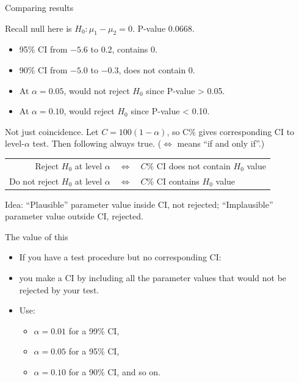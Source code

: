 \documentclass[ignorenonframetext,]{beamer}
\providecommand{\tightlist}{%
  \setlength{\itemsep}{0pt}\setlength{\parskip}{0pt}}
\begin{document}
\begin{frame}{Comparing results}
\protect\hypertarget{comparing-results}{}

Recall null here is \(H_0 : \mu_1 - \mu_2 = 0\). P-value 0.0668.

\begin{itemize}
\tightlist
\item
  95\% CI from \(-5.6\) to 0.2, contains 0.
\item
  90\% CI from \(-5.0\) to \(-0.3\), does not contain 0.
\item
  At \(\alpha = 0.05\), would not reject \(H_0\) since P-value
  \textgreater{} 0.05.
\item
  At \(\alpha = 0.10\), would reject \(H_0\) since P-value \textless{}
  0.10.
\end{itemize}

Not just coincidence. Let \(C = 100(1 - \alpha)\), so C\% gives
corresponding CI to level-\(\alpha\) test. Then following always true.
(\(\iff\) means ``if and only if''.)

\begin{tabular}{|rcl|}
  \hline
  Reject $H_0$ at level $\alpha$ & $\iff$ & $C\%$ CI does not contain $H_0$ value\\
  Do not reject $H_0$ at level $\alpha$ & $\iff$ & $C\%$ CI contains $H_0$ value\\
  \hline
\end{tabular}

Idea: ``Plausible'' parameter value inside CI, not rejected;
``Implausible'' parameter value outside CI, rejected.

\end{frame}

\begin{frame}{The value of this}
\protect\hypertarget{the-value-of-this}{}

\begin{itemize}
\tightlist
\item
  If you have a test procedure but no corresponding CI:
\item
  you make a CI by including all the parameter values that would not be
  rejected by your test.
\item
  Use:

  \begin{itemize}
  \tightlist
  \item
    \(\alpha = 0.01\) for a 99\% CI,
  \item
    \(\alpha = 0.05\) for a 95\% CI,
  \item
    \(\alpha = 0.10\) for a 90\% CI, and so on.
  \end{itemize}
\end{itemize}

\end{frame}
\end{document}
